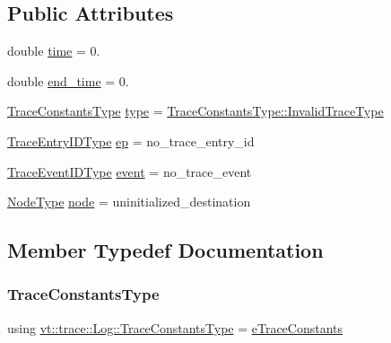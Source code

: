 \subsection*{Public Attributes}
\begin{DoxyCompactItemize}
\item 
double \hyperlink{structvt_1_1trace_1_1_log_a91a7891f5f287385c1323053e3c675c0}{time} = 0.
\item 
double \hyperlink{structvt_1_1trace_1_1_log_a86325bb2e6116b587f168bc2f1701f3a}{end\+\_\+time} = 0.
\item 
\hyperlink{namespacevt_1_1trace_acf454dfbd581b0ebae895f90b5927a1d}{Trace\+Constants\+Type} \hyperlink{structvt_1_1trace_1_1_log_a6415eacd3721d71029ff6edb909fc63d}{type} = \hyperlink{namespacevt_1_1trace_acf454dfbd581b0ebae895f90b5927a1da319f6b5fbfb85275879d449149167c7e}{Trace\+Constants\+Type\+::\+Invalid\+Trace\+Type}
\item 
\hyperlink{namespacevt_1_1trace_a3c14050715ba9eceaeff51fb3de64f2f}{Trace\+Entry\+I\+D\+Type} \hyperlink{structvt_1_1trace_1_1_log_aaeb605b768747d37e7b4bb062f14bb32}{ep} = no\+\_\+trace\+\_\+entry\+\_\+id
\item 
\hyperlink{namespacevt_1_1trace_a64a7185f3e102df8d8258f263ccd1582}{Trace\+Event\+I\+D\+Type} \hyperlink{structvt_1_1trace_1_1_log_a88aa88893277f0feb9776e96048a9294}{event} = no\+\_\+trace\+\_\+event
\item 
\hyperlink{namespacevt_a866da9d0efc19c0a1ce79e9e492f47e2}{Node\+Type} \hyperlink{structvt_1_1trace_1_1_log_a39a932cb9c4775f83117d0be477bc8c8}{node} = uninitialized\+\_\+destination
\end{DoxyCompactItemize}


\subsection{Member Typedef Documentation}
\mbox{\label{structvt_1_1trace_1_1_log_a06f69176ce883a9e8a45ffb726fdc558}} 
\subsubsection{\texorpdfstring{Trace\+Constants\+Type}{TraceConstantsType}}
{\footnotesize\ttfamily using \hyperlink{namespacevt_1_1trace_acf454dfbd581b0ebae895f90b5927a1d}{vt\+::trace\+::\+Log\+::\+Trace\+Constants\+Type} =  \hyperlink{namespacevt_1_1trace_acf454dfbd581b0ebae895f90b5927a1d}{e\+Trace\+Constants}}


